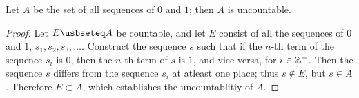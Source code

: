 \begin{theorem}\label{theorem_2.1.4}
  Let $A$ be the set of all sequences of $0$ and $1$; then  $A$ is uncountable.
\end{theorem}
\begin{proof}
  Let $E \usbseteq A$ be countable, and let $E$ consist of all the sequences of
  $0$ and $1$,  $s_1,s_2,s_3, \dots$. Construct the sequence $s$ such that if the
  $n$-th term of the sequence  $s_i$ is  $0$, then the  $n$-th term of  $s$ is
  $1$, and vice versa, for $i \in \mathbb{Z}^+$. Then the sequence  $s$ differs from the
  sequence  $s_i$ at atleast one place; thus  $s \not\in E$, but  $s \in A$.
  Therefore  $E \subset A$, which establishes the uncountablitiy of $A$.
\end{proof}
